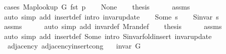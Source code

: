 \begin{isabellebody}
%
\isadelimproof
%
\endisadelimproof
%
\isatagproof
{}\isamarkupfalse%
\ {\isacharparenleft}{\kern0pt}cases\ {\isachardoublequoteopen}Map{\isacharunderscore}{\kern0pt}lookup\ G\ {\isacharparenleft}{\kern0pt}fst\ p{\isacharparenright}{\kern0pt}{\isachardoublequoteclose}{\isacharparenright}{\kern0pt}\isanewline
\ \ \isamarkupfalse%
\ None\isanewline
\ \ \isamarkupfalse%
\ {\isacharquery}{\kern0pt}thesis\isanewline
\ \ \ \ \isamarkupfalse%
\ assms\isanewline
\ \ \ \ \isamarkupfalse%
\ {\isacharparenleft}{\kern0pt}auto\ simp\ add{\isacharcolon}{\kern0pt}\ insert{\isacharunderscore}{\kern0pt}{}{\isacharunderscore}{\kern0pt}def\ intro{\isacharcolon}{\kern0pt}\ invar{\isacharunderscore}{\kern0pt}update{\isacharparenright}{\kern0pt}\isanewline
{}\isamarkupfalse%
\isanewline
\ \ \isamarkupfalse%
\ {\isacharparenleft}{\kern0pt}Some\ s{\isacharparenright}{\kern0pt}\isanewline
\ \ \isamarkupfalse%
\ {\isachardoublequoteopen}S{\isachardot}{\kern0pt}invar\ s{\isachardoublequoteclose}\isanewline
\ \ \ \ \isamarkupfalse%
\ assms{\isacharparenleft}{\kern0pt}{}{\isacharparenright}{\kern0pt}\isanewline
\ \ \ \ \isamarkupfalse%
\ {\isacharparenleft}{\kern0pt}auto\ simp\ add{\isacharcolon}{\kern0pt}\ invar{\isacharunderscore}{\kern0pt}def\ M{\isachardot}{\kern0pt}ran{\isacharunderscore}{\kern0pt}def{\isacharparenright}{\kern0pt}\isanewline
\ \ \isamarkupfalse%
\ {\isacharquery}{\kern0pt}thesis\isanewline
\ \ \ \ \isamarkupfalse%
\ assms{\isacharparenleft}{\kern0pt}{}{\isacharparenright}{\kern0pt}\isanewline
\ \ \ \ \isamarkupfalse%
\ {\isacharparenleft}{\kern0pt}auto\ simp\ add{\isacharcolon}{\kern0pt}\ insert{\isacharunderscore}{\kern0pt}{}{\isacharunderscore}{\kern0pt}def\ Some\ intro{\isacharcolon}{\kern0pt}\ S{\isachardot}{\kern0pt}invar{\isacharunderscore}{\kern0pt}fold{\isacharunderscore}{\kern0pt}insert\ invar{\isacharunderscore}{\kern0pt}update{\isacharparenright}{\kern0pt}\isanewline
{}\isamarkupfalse%
%
\endisatagproof
{\isafoldproof}%
%
\isadelimproof
\isanewline
%
\endisadelimproof
\isanewline
{}\isamarkupfalse%
\ {\isacharparenleft}{\kern0pt}\ adjacency{\isacharparenright}{\kern0pt}\ adjacency{\isacharunderscore}{\kern0pt}insert{\isacharunderscore}{\kern0pt}{}{\isacharunderscore}{\kern0pt}cong{\isacharcolon}{\kern0pt}\isanewline
\ \ \ {\isachardoublequoteopen}invar\ G{\isachardoublequoteclose}\isanewline

\end{isabellebody}

